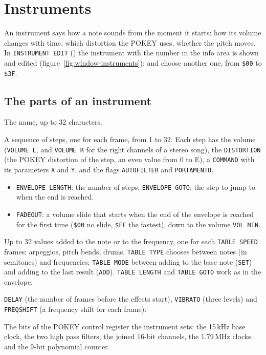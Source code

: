 \chapter{Instruments}\label{ch:instruments}

An instrument says how a note sounds from the moment it starts: how its volume changes with time, which distortion the POKEY
uses, whether the pitch moves. In \texttt{INSTRUMENT EDIT} () the instrument with the number in the info area is shown and
edited (figure~\ref{fig:window-instruments});  and  choose another one, from \texttt{\$00} to
\texttt{\$3F}.

\section{The parts of an instrument}

\begin{description}[style=nextline,leftmargin=1.2cm]
  \item[\texttt{NAME}] The name, up to 32 characters.
  \item[Envelope] A sequence of steps, one for each frame, from 1 to 32. Each step has the volume (\texttt{VOLUME L}, and
        \texttt{VOLUME R} for the right channels of a stereo song), the \texttt{DISTORTION} (the POKEY distortion of the step,
        an even value from 0 to E), a \texttt{COMMAND} with its parameters \texttt{X} and \texttt{Y}, and the flags
        \texttt{AUTOFILTER} and \texttt{PORTAMENTO}.
        \begin{itemize}
          \item \texttt{ENVELOPE LENGTH}: the number of steps; \texttt{ENVELOPE GOTO}: the step to jump to when the end is reached.
          \item \texttt{FADEOUT}: a volume slide that starts when the end of the envelope is reached for the first time
                (\texttt{\$00} no slide, \texttt{\$FF} the fastest), down to the volume \texttt{VOL MIN}.
        \end{itemize}
  \item[Table of notes / frequencies] Up to 32 values added to the note or to the frequency, one for each \texttt{TABLE SPEED}
        frames: arpeggios, pitch bends, drums. \texttt{TABLE TYPE} chooses between notes (in semitones) and frequencies;
        \texttt{TABLE MODE} between adding to the base note (\texttt{SET}) and adding to the last result (\texttt{ADD}).
        \texttt{TABLE LENGTH} and \texttt{TABLE GOTO} work as in the envelope.
  \item[Effects] \texttt{DELAY} (the number of frames before the effects start), \texttt{VIBRATO} (three levels) and
        \texttt{FREQSHIFT} (a frequency shift for each frame).
  \item[\texttt{AUDCTL}] The bits of the POKEY control register the instrument sets: the 15\,kHz base clock, the two high
        pass filters, the joined 16-bit channels, the 1.79\,MHz clocks and the 9-bit polynomial counter.
\end{description}

